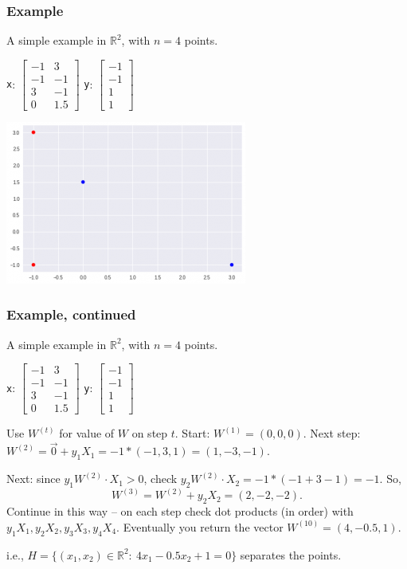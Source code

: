 \documentclass{beamer}
\theoremstyle{example}
\newcommand{\ttt}[1]{{\small\texttt{#1}}}
\begin{document}
\begin{frame}
    \frametitle{Example}
    A simple example in $\mathbb R^2$, with $n=4$ points.

    \begin{center}
    \ttt{x}: $\begin{bmatrix}-1 & 3 \\ -1 & -1 \\ 3 & -1 \\ 0 & 1.5\end{bmatrix}$  \qquad\qquad
    \ttt{y}: $\begin{bmatrix}-1 \\ -1 \\ 1 \\ 1\end{bmatrix}$
    \end{center}

    \centering
    \includegraphics[height=0.3\textheight]{../../Images/ex2_data_halfspace.png}
\end{frame}

\begin{frame}
    \frametitle{Example, continued}
    A simple example in $\mathbb R^2$, with $n=4$ points.

    \begin{center}
    \ttt{x}: $\begin{bmatrix}-1 & 3 \\ -1 & -1 \\ 3 & -1 \\ 0 & 1.5\end{bmatrix}$  \qquad\qquad
    \ttt{y}: $\begin{bmatrix}-1 \\ -1 \\ 1 \\ 1\end{bmatrix}$
    \end{center}

    Use $W^{(t)}$ for value of $W$ on step $t$. Start: $W^{(1)} = (0,0,0)$. \newline 
    Next step: $W^{(2)} = \vec{0} + y_1X_1 = -1\ast(-1,3,1) = (1,-3,-1)$.
    \pause
    
    Next: since $y_1W^{(2)}\cdot X_1 > 0$, check $y_2W^{(2)}\cdot X_2 = -1\ast(-1 + 3 -1) = -1$. \pause
    So, 
        \[W^{(3)} = W^{(2)} + y_2X_2 = (2, -2, -2).\]
    \pause 
    Continue in this way {--} on each step check dot products (in order) with $y_1X_1, y_2X_2, y_3X_3, y_4X_4$. Eventually you return the vector $W^{(10)} = (4, -0.5, 1)$. 
    
    \pause
    i.e., $H = \{(x_1,x_2)\in \mathbb R^2:\ 4x_1-0.5x_2 + 1 = 0\}$ separates the points.
\end{frame}
\end{document}
